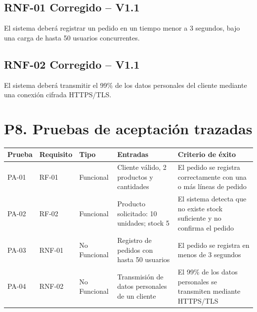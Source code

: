 \documentclass[12pt,a4paper]{article}
\begin{document}
\subsection*{RNF-01 Corregido -- V1.1}

El sistema deberá registrar un pedido en un tiempo menor a 3 segundos,
bajo una carga de hasta 50 usuarios concurrentes.

\subsection*{RNF-02 Corregido -- V1.1}

El sistema deberá transmitir el 99\% de los datos personales del cliente
mediante una conexión cifrada HTTPS/TLS.


\section*{P8. Pruebas de aceptación trazadas}

\begin{table}[H]
\centering
\small

\begin{tabularx}{\textwidth}{
|>{\centering\arraybackslash}p{1.3cm}
|>{\centering\arraybackslash}p{1.5cm}
|>{\centering\arraybackslash}p{2.1cm}
|>{\raggedright\arraybackslash}p{3.6cm}
|>{\raggedright\arraybackslash}X|
}
\hline

\textbf{Prueba} &
\textbf{Requisito} &
\textbf{Tipo} &
\textbf{Entradas} &
\textbf{Criterio de éxito} \\
\hline

PA-01 &
RF-01 &
Funcional &
Cliente válido, 2 productos y cantidades &
El pedido se registra correctamente con una o más líneas de pedido \\
\hline

PA-02 &
RF-02 &
Funcional &
Producto solicitado: 10 unidades; stock 5 &
El sistema detecta que no existe stock suficiente y no confirma el pedido \\
\hline

PA-03 &
RNF-01 &
No Funcional &
Registro de pedidos con hasta 50 usuarios &
El pedido se registra en menos de 3 segundos \\
\hline

PA-04 &
RNF-02 &
No Funcional &
Transmisión de datos personales de un cliente &
El 99\% de los datos personales se transmiten mediante HTTPS/TLS \\
\hline

\end{tabularx}
\end{table}
\end{document}
